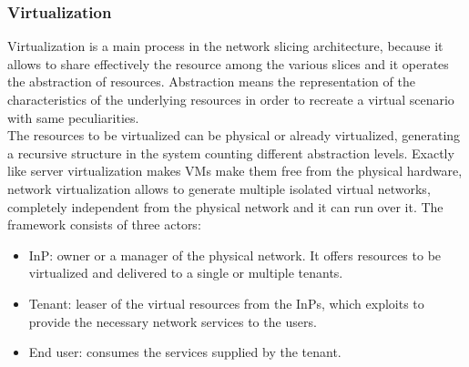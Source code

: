 \documentclass[a4paper,12pt]{report} %
\begin{document}
\subsubsection{Virtualization}
Virtualization is a main process in the network slicing architecture,
because it allows to share effectively the resource among the various
slices and it operates the abstraction of resources. Abstraction means the representation of the characteristics of the underlying resources in order to recreate a virtual scenario with same peculiarities. \\
The resources to be virtualized can be physical or already virtualized, generating a
recursive structure in the system counting different abstraction levels.
Exactly like server virtualization makes \gls{VM}s make them free from the physical hardware, network virtualization allows
to generate multiple isolated virtual networks, completely independent from the physical network and it can run over it.
The framework consists of three actors:
\begin{itemize}
\item \gls{InP}: owner or a manager of the physical network. It offers resources to be virtualized and delivered to a single or multiple tenants.
\end{itemize}
\begin{itemize}
\item Tenant: leaser of the virtual resources from the InPs, which exploits to provide the necessary network services to the users. 
\end{itemize}
\begin{itemize}
\item End user: consumes the services
supplied by the tenant.
\end{itemize}
\cite{etsi2017gs} \cite{ordonez2017network} \cite{marsch20185g}
\end{document}
